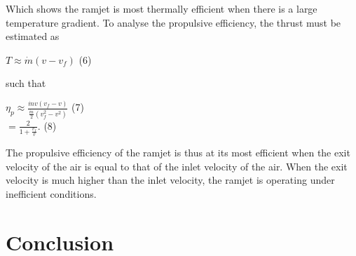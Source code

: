 \documentclass[12pt,onecolumn]{IEEEtran}
\begin{document}
Which shows the ramjet is most thermally efficient when there is a large temperature gradient.
\vspace{3mm}
To analyse the propulsive efficiency, the thrust must be estimated as\\
\begin{center}
$T\approx\dot{m}(v-v_f)$ (6)
\end{center}
\vspace{1mm}
such that\\
\begin{center}
$\eta_p\approx\frac{\dot{m}v(v_f-v)}{\frac{\dot{m}}{2}(v_f^2-v^2)}$ (7)\\
\vspace{1mm}
$=\frac{2}{1+\frac{v_f}{v}}$. (8)
\end{center}
The propulsive efficiency of the ramjet is thus at its most efficient when the exit velocity of the air is equal to that of the inlet velocity of the air. When the exit velocity is much higher than the inlet velocity, the ramjet is operating under inefficient conditions.
\section{Conclusion}



\end{document}
